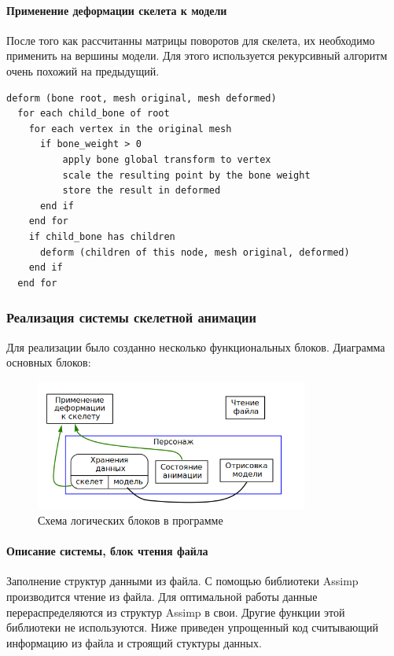 \paragraph{Применение деформации скелета к модели}

После того как рассчитанны матрицы поворотов для скелета, их необходимо применить на вершины модели.
Для этого используется рекурсивный алгоритм очень похожий на предыдущий.

\begin{scriptsize}
\begin{verbatim}
deform (bone root, mesh original, mesh deformed)
  for each child_bone of root
    for each vertex in the original mesh
      if bone_weight > 0
          apply bone global transform to vertex
          scale the resulting point by the bone weight
          store the result in deformed
      end if
    end for
    if child_bone has children
      deform (children of this node, mesh original, deformed)
    end if
  end for
\end{verbatim}
\end{scriptsize}


\subsubsection{Реализация системы скелетной анимации}

Для реализации  было созданно несколько функциональных блоков.
Диаграмма основных блоков:

\begin{figure}[h!]
    \centering
    \includegraphics[width=0.8\textwidth]{block_diagram.png}
    \caption{\scriptsize{Схема логических блоков в программе}}
\end{figure}


\paragraph{Описание системы, блок чтения файла}
Заполнение структур данными из файла.
С помощью библиотеки Assimp производится чтение из файла. Для оптимальной работы данные перераспределяются из структур Assimp в свои. Другие функции этой библиотеки не используются.
Ниже приведен упрощенный код считывающий информацию из файла и строящий стуктуры данных.


